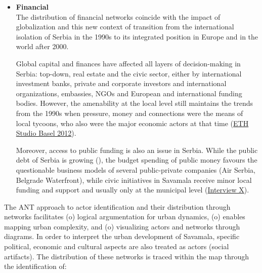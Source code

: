 \documentclass[11pt]{report}
\begin{document}
{{{{\begin{itemize}
Another problematic issue of the cumbersome institutional structure inherited from socialism is the lack of any official procedures to assign a regulation as outdated.
With strong authoritarianism and hierarchy in urban institutions, it is very common that obsolete and inefficient structures, documents and procedures are replicated, while the public interest is usually not served and very often it is not sufficient as an excuse for regulation changes  (\href{InterviewX}{Interview X}).
In this manner, the once thriving cultural and civic activities in Savamala (2012-2013) have to date been left unregulated and uninstitutionalized %
even though politicians often officially use them as examples of good, local practice (\href{N1}{\citealt{n1_princ_2016}}).
\\

\item \textbf{Financial}
\\
The distribution of financial networks coincide with the impact of globalization and this new context of transition from the international isolation of Serbia in the 1990s to its integrated position in Europe and in the world after 2000.

Global capital and finances have affected all layers of decision-making in Serbia: top-down, real estate and the civic sector, either by international investment banks, private and corporate investors and international organizations, embassies, NGOs and European and international funding bodies.
However, the amenability at the local level still maintains the trends from the 1990s when pressure, money and connections were the means of local tycoons, who also were the major economic actors at that time (\href{ETHZ}{ETH Studio Basel 2012}).

Moreover, access to public funding is also an issue in Serbia.
While the public debt of Serbia is growing (\href{MF}{\citealt{ministarstvo_finansija_republike_srbije_javni_2016}}),
the budget spending of public money favours the questionable business models of several public-private companies (Air Serbia, Belgrade Waterfront), while civic initiatives in Savamala receive minor local funding and support and usually only at the municipal level (\href{InterviewX}{Interview X}).
\end{itemize}

The ANT approach to actor identification and their distribution through networks facilitates
(o) logical argumentation for urban dynamics,
(o) enables mapping urban complexity, and
(o) visualizing actors and networks through diagrams.
In order to interpret the urban development of Savamala, specific political, economic and cultural aspects are also treated as actors (social artifacts).
The distribution of these networks is traced within the map through the identification of:

}}}}
\end{document}
